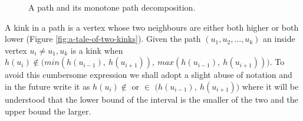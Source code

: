 \begin{figure}%
    \centering
    \qquad
    \caption{A path and its monotone path decomposition.}
    \label{fig:monotone-decomposition}%
\end{figure}




A kink in a path is a vertex whose two neighbours are either both higher or both lower (Figure \ref{fig:a-tale-of-two-kinks}). Given the path $(u_1, u_2, ... , u_k)$ an inside vertex $u_i \ne u_1, u_k$ is a kink when $h(u_i) \notin \big( min(h(u_{i-1}),~h(u_{i+1})),~max(h(u_{i-1}),~h(u_{i+1})) \big)$. To avoid this cumbersome expression we shall adopt a slight abuse of notation and in the future write it as $h(u_i) \notin $ or $ \in $ $\big(h(u_{i-1}),~h(u_{i+1}) \big)$ where it will be understood that the lower bound of the interval is the smaller of the two and the upper bound the larger.


